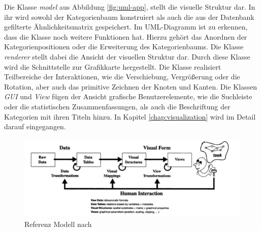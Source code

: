 Die Klasse \emph{model} aus Abbildung \ref{fig:uml-app}, stellt die visuelle Struktur dar. %
In ihr wird sowohl der Kategorienbaum konstruiert als auch die aus der Datenbank gefilterte Ähnlichkeitsmatrix gespeichert.
Im UML-Diagramm ist zu erkennen, dass die Klasse noch weitere Funktionen hat. Hierzu gehört das Anordnen der Kategorienpositionen oder die Erweiterung des Kategorienbaums.
Die Klasse \emph{renderer} stellt dabei die Ansicht der visuellen Struktur dar. Durch diese Klasse wird die Schnittstelle zur Grafikkarte hergestellt.
Die Klasse realisiert Teilbereiche der Interaktionen, wie die Verschiebung, Vergrößerung oder die Rotation, aber auch das primitive Zeichnen der Knoten und Kanten.
Die Klassen \emph{GUI} und \emph{View} fügen der Ansicht grafische Benutzerelemente, wie die Suchleiste oder die statistischen Zusammenfassungen, als auch die Beschriftung der Kategorien mit ihren Titeln hinzu.
In Kapitel \ref{chap:visualization} wird im Detail darauf eingegangen.

\begin{figure}
    \centering
    \includegraphics[width=\textwidth]{images/card-model.png}
    \caption{Referenz Modell nach }
    \label{fig:ref-model}
\end{figure}




